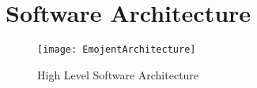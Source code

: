 \chapter{Software Architecture}
\begin{figure}[H]
    \centering
    \texttt{[image: EmojentArchitecture]}
    \caption{High Level Software Architecture}
    \label{fig:EmojentArchitecture}
\end{figure}